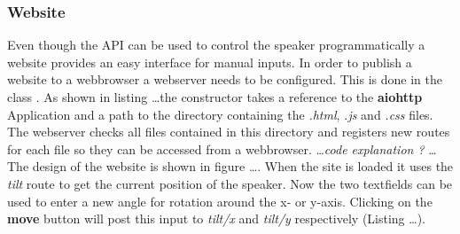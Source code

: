 \subsubsection*{Website}

Even though the API can be used to control the speaker programmatically a website provides an easy interface for manual inputs.\p
%
In order to publish a website to a webbrowser a webserver needs to be configured. This is done in the class . As shown in listing \dots the constructor takes a reference to the \textbf{aiohttp} Application and a path to the directory containing the \textit{.html}, \textit{.js} and \textit{.css} files. The webserver checks all files contained in this directory and registers new routes for each file so they can be accessed from a webbrowser.\p
\dots \textit{code explanation ?} \dots\p
%
The design of the website is shown in figure \dots. When the site is loaded it uses the \textit{tilt} route to get the current position of the speaker. Now the two textfields can be used to enter a new angle for rotation around the x- or y-axis. Clicking on the \textbf{move} button will post this input to \textit{tilt/x} and \textit{tilt/y} respectively (Listing \dots).
